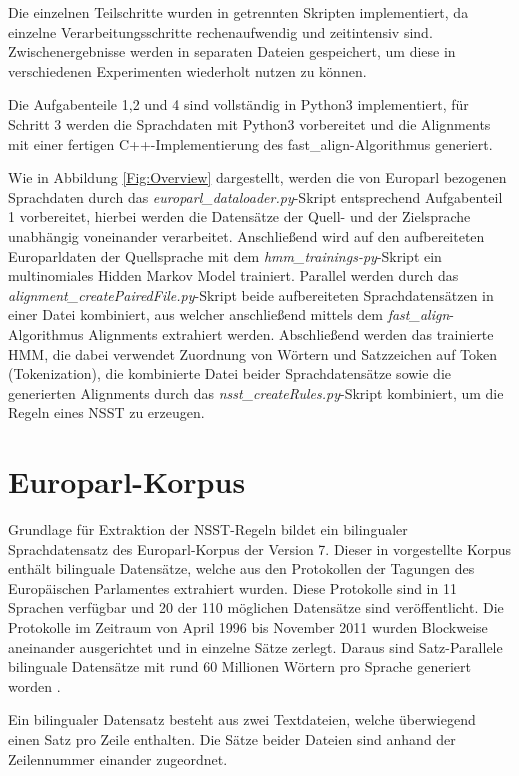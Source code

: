 \documentclass[conference]{IEEEtran}
\begin{document}
Die einzelnen Teilschritte wurden in getrennten Skripten implementiert, da einzelne Verarbeitungsschritte rechenaufwendig und zeitintensiv sind.
Zwischenergebnisse werden in separaten Dateien gespeichert, um diese in verschiedenen Experimenten wiederholt nutzen zu können.

Die Aufgabenteile 1,2 und 4 sind vollständig in Python3 implementiert, für Schritt 3 werden die Sprachdaten mit Python3\- vorbereitet und die Alignments mit einer fertigen C++-Implementierung des fast\_align-Algorithmus \cite{fast_align} generiert.

Wie in Abbildung \ref{Fig:Overview} dargestellt, werden die von Europarl bezogenen Sprachdaten durch das \textit{europarl\_dataloader.py}-Skript entsprechend Aufgabenteil 1 vorbereitet, hierbei werden die Datensätze der Quell- und der Zielsprache unabhängig voneinander verarbeitet.
Anschließend wird auf den aufbereiteten Europarldaten der Quellsprache mit dem \textit{hmm\_trainings-py}-Skript ein multinomiales Hidden Markov Model trainiert.
Parallel werden durch das \textit{alignment\_createPairedFile.py}-Skript beide aufbereiteten Sprachdatensätzen in einer Datei kombiniert, aus welcher anschließend mittels dem \textit{fast\_align}-Algorithmus Alignments extrahiert werden.
Abschließend werden das trainierte HMM, die dabei verwendet Zuordnung von Wörtern und Satzzeichen auf Token (Tokenization), die kombinierte Datei beider Sprachdatensätze sowie die generierten Alignments durch das \textit{nsst\_createRules.py}-Skript kombiniert, um die Regeln eines NSST zu erzeugen.

\section{Europarl-Korpus}
\label{Europarl-Korpus}
Grundlage für Extraktion der NSST-Regeln bildet ein bilingualer Sprachdatensatz des Europarl-Korpus der Version 7.
Dieser in \cite{europarl} vorgestellte Korpus enthält bilinguale Daten\-sätze, welche aus den Protokollen der Tagungen des Europäischen Parlamentes extrahiert wurden.
Diese Protokolle sind in 11 Sprachen verfügbar und 20 der 110 möglichen Datensätze sind veröffentlicht.
Die Protokolle im Zeitraum von April 1996 bis November 2011 wurden Blockweise aneinander ausgerichtet und in einzelne Sätze zerlegt. 
Daraus sind Satz-Parallele bilinguale Datensätze mit rund 60 Millionen Wörtern pro Sprache generiert worden \cite{europarl:url}.

Ein bilingualer Datensatz besteht aus zwei Textdateien, welche überwiegend einen Satz pro Zeile enthalten. 
Die Sätze beider Dateien sind anhand der Zeilennummer einander zugeordnet.
\end{document}
